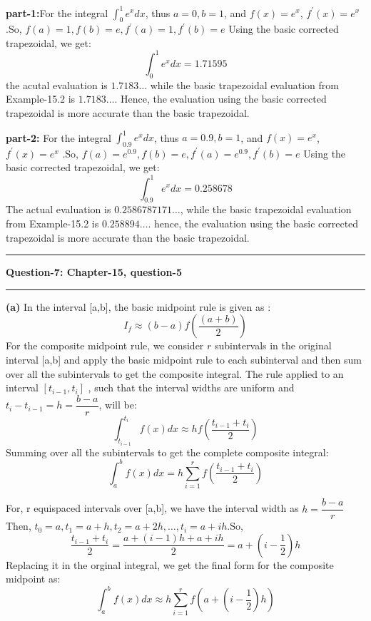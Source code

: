 \documentclass{article}
\newcommand\question[2]{\vspace{.25in}\hrule\textbf{#1: #2}\hrule\vspace{.10in}}
\renewcommand\part[1]{\vspace{.10in}\textbf{(#1)}}
\begin{document}
  \textbf {part-1:}For the integral $\int_{0}^{1}e^x dx$, thus $a=0,b=1$, and $f(x) = e^x$, $f^\prime(x) = e^x$ .So, $f(a)=1,f(b)=e,f^\prime(a)=1, f^\prime(b)=e$ \newline
  Using the basic corrected trapezoidal, we get:
  \[\int_{0}^{1}e^x dx = 1.71595\]
  the acutal evaluation is $1.7183\dots$ while the basic trapezoidal evaluation from Example-15.2 is $1.7183\dots$. Hence, the evaluation using the basic corrected trapezoidal is more accurate than the basic trapezoidal. \newline

  \textbf {part-2:} For the integral $\int_{0.9}^{1}e^x dx$, thus $a=0.9,b=1$, and $f(x) = e^x$, $f^\prime(x) = e^x$ .So, $f(a)=e^{0.9},f(b)=e,f^\prime(a)=e^{0.9}, f^\prime(b)=e$ \newline
  Using the basic corrected trapezoidal, we get:
  \[\int_{0.9}^{1}e^x dx = 0.258678\]
  The actual evaluation is $0.2586787171\dots$, while the basic trapezoidal evaluation from Example-15.2 is $0.258894\dots$. hence, the evaluation using the basic corrected trapezoidal is more accurate than the basic trapezoidal. \newline

  \question{Question-7}{Chapter-15, question-5}
  \part{a} In the interval [a,b], the basic midpoint rule is given as :
  \begin{equation}
	  I_f \approx (b-a)f(\dfrac{(a+b)}{2})
	  \label{eq:bmid}
  \end{equation}
  For the composite midpoint rule, we consider $r$ subintervals in the original interval [a,b] and apply the basic midpoint rule to each subinterval and then sum over all the subintervals to get the composite integral. The rule applied to an interval $[t_{i-1},t_i]$ , such that the interval widths are uniform and $t_i - t_{i-1} = h = \dfrac{b-a}{r}$, will be:
  \[ \int_{t_{i-1}}^{t_i} f(x) dx \approx hf(\dfrac{t_{i-1} + t_i}{2})\]
  Summing over all the subintervals to get the complete composite integral:
  \[ \int_{a}^{b} f(x)dx = h \sum_{i=1}^r f(\dfrac{t_{i-1} + t_i}{2}) \]

  For, r equispaced intervals over [a,b], we have the interval width as $h = \dfrac{b-a}{r}$
  Then, $t_0 = a, t_1 = a+h, t_2 = a+2h, \dots, t_i = a+ih$.So,
  \[\dfrac{t_{i-1} + t_i}{2} = \dfrac{a + (i-1)h + a+ih}{2} = a + (i - \dfrac{1}{2})h\]
  Replacing it in the orginal integral, we get the final form for the composite midpoint as:
  \[\int_{a}^{b} f(x)dx \approx h \sum_{i=1}^r  f(a + (i - \dfrac{1}{2})h)\]
\end{document}

